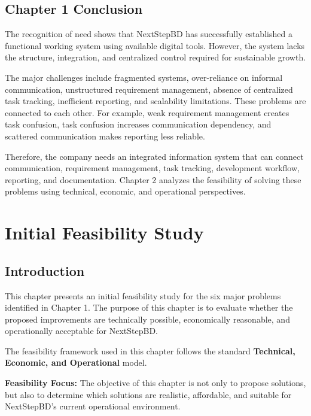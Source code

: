 \documentclass[12pt,a4paper]{report}
\begin{document}
\section{Chapter 1 Conclusion}

The recognition of need shows that NextStepBD has successfully established a functional working system using available digital tools. However, the system lacks the structure, integration, and centralized control required for sustainable growth.

The major challenges include fragmented systems, over-reliance on informal communication, unstructured requirement management, absence of centralized task tracking, inefficient reporting, and scalability limitations. These problems are connected to each other. For example, weak requirement management creates task confusion, task confusion increases communication dependency, and scattered communication makes reporting less reliable.

Therefore, the company needs an integrated information system that can connect communication, requirement management, task tracking, development workflow, reporting, and documentation. Chapter 2 analyzes the feasibility of solving these problems using technical, economic, and operational perspectives.

\newpage

\chapter{Initial Feasibility Study}

\section{Introduction}

This chapter presents an initial feasibility study for the six major problems identified in Chapter 1. The purpose of this chapter is to evaluate whether the proposed improvements are technically possible, economically reasonable, and operationally acceptable for NextStepBD.

The feasibility framework used in this chapter follows the standard \textbf{Technical, Economic, and Operational} model.

\begin{noteBox}
\textbf{Feasibility Focus:} The objective of this chapter is not only to propose solutions, but also to determine which solutions are realistic, affordable, and suitable for NextStepBD's current operational environment.
\end{noteBox}
\end{document}
